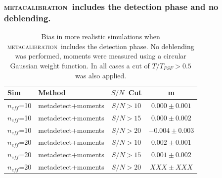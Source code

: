 \documentclass{beamer}
\newcommand{\mcal}{\textsc{metacalibration}}
\newcommand{\snr}{$S/N$}
\newcommand{\neff}{$n_{eff}$}
\begin{document}
\begin{frame}
    \frametitle{\mcal\ includes the detection phase and no deblending.}

 
    \begin{table}
        \centering
        \begin{tabular}{|l|l|c|c|}
            \hline
            Sim & Method         & \snr\ Cut & m             \\
            \hline

            \hline
            \neff=10    & metadetect+moments    & \snr$ > 10$ & $0.000 \pm 0.001$  \\
            \neff=10    & metadetect+moments    & \snr$ > 15$ & $0.000 \pm 0.002$  \\
            \neff=10    & metadetect+moments    & \snr$ > 20$ & $-0.004 \pm 0.003$  \\
            \hline
            \neff=20    & metadetect+moments    & \snr$ > 10$ & $0.002 \pm 0.001$  \\
            \neff=20    & metadetect+moments    & \snr$ > 15$ & $0.001 \pm 0.002$  \\
            \neff=20    & metadetect+moments    & \snr$ > 20$ & $XXX \pm XXX$  \\
            \hline

        \end{tabular}
        \caption{Bias in more realistic simulations when \mcal\ includes
            the detection phase.  No deblending was performed, 
            moments were measured using a circular Gaussian weight function.
            In all cases a cut of $T/T_{PSF} > 0.5$ was also applied.
        \label{tab:mcal:deblending}}
    \end{table}


\end{frame}
\end{document}
